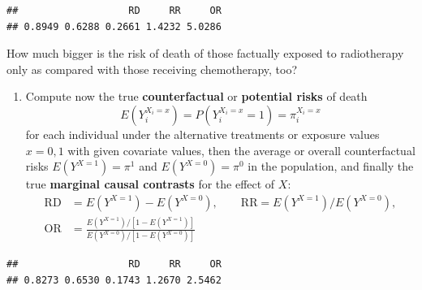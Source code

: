 \documentclass[
]{book}
\newenvironment{Shaded}{\begin{snugshade}}{\end{snugshade}}
\newcommand{\AttributeTok}[1]{\textcolor[rgb]{0.13,0.29,0.53}{#1}}
\newcommand{\DecValTok}[1]{\textcolor[rgb]{0.00,0.00,0.81}{#1}}
\newcommand{\FunctionTok}[1]{\textcolor[rgb]{0.13,0.29,0.53}{\textbf{#1}}}
\newcommand{\NormalTok}[1]{#1}
\newcommand{\OtherTok}[1]{\textcolor[rgb]{0.56,0.35,0.01}{#1}}
\newcommand{\SpecialCharTok}[1]{\textcolor[rgb]{0.81,0.36,0.00}{\textbf{#1}}}
\providecommand{\tightlist}{%
  \setlength{\itemsep}{0pt}\setlength{\parskip}{0pt}}
\begin{document}
\begin{verbatim}
##                   RD     RR     OR 
## 0.8949 0.6288 0.2661 1.4232 5.0286
\end{verbatim}

How much bigger is the risk of death of those factually exposed to
radiotherapy only as compared with those receiving chemotherapy, too?

\begin{enumerate}
\def\labelenumi{\arabic{enumi}.}
\setcounter{enumi}{1}
\tightlist
\item
  Compute now the true \textbf{counterfactual} or
  \textbf{potential risks} of death
  \[ E(Y_i^{X_i=x}) = P(Y_i^{X_i=x}=1) = \pi_i^{X_i=x} \]
  for each
  individual under the alternative treatments or exposure values
  \(x=0,1\) with given covariate values, then the
  average or overall counterfactual risks \(E(Y^{X=1}) = \pi^1\)
  and \(E(Y^{X=0}) = \pi^0\) in the population,
  and finally the true \textbf{marginal causal contrasts}
  for the effect of \(X\):
  \[
  \begin{aligned}
   \text{RD} & = E(Y^{X=1})-E(Y^{X=0}), \qquad  \text{RR} = E(Y^{X=1})/E(Y^{X=0}), \\
   \text{OR} & = \frac{E(Y^{X=1})/[1 -  E(Y^{X=1})]}{E(Y^{X=0})/[1 -  E(Y^{X=0})] }
  \end{aligned}
  \]
\end{enumerate}

\begin{Shaded}
\end{Shaded}

\begin{verbatim}
##                   RD     RR     OR 
## 0.8273 0.6530 0.1743 1.2670 2.5462
\end{verbatim}
\end{document}
